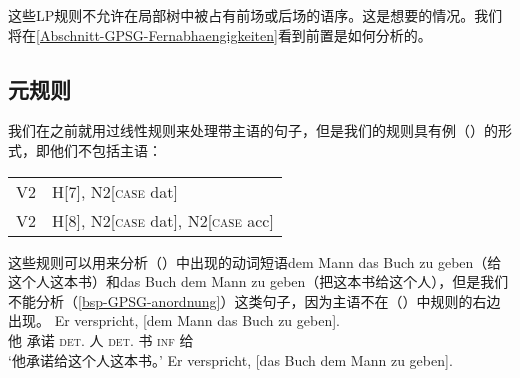 这些LP规则不允许在局部树中被占有前场或后场的语序。这是想要的情况。我们将在\ref{Abschnitt-GPSG-Fernabhaengigkeiten}看到前置是如何分析的。

\subsection{元规则}
\label{sec-metarules-gpsg}

我们在之前就用过线性规则来处理带主语的句子，但是我们的规则具有例（）的形式，即他们不包括主语：
\ea
\label{gpsg-regel-dat-ditransitiv}
\begin{tabular}[t]{@{}l@{~$\to$~}l@{}}
V2  & H[7], N2[\textsc{case} dat]                \\
V2  & H[8], N2[\textsc{case} dat], N2[\textsc{case} acc]  \\
\end{tabular}
\z
这些规则可以用来分析（）中出现的动词短语dem Mann das Buch zu geben（给这个人这本书）和das Buch dem Mann zu geben（把这本书给这个人），但是我们不能分析（\ref{bsp-GPSG-anordnung}）这类句子，因为主语不在（）中规则的右边出现。
\eal
\ex 
\gll Er verspricht, [dem Mann das Buch zu geben].\\
     他 承诺    \spacebr{}\textsc{det}.\dat{} 人 \textsc{det}.\acc{} 书 \textsc{inf} 给\\
\glt `他承诺给这个人这本书。'
\ex 
\gll Er verspricht, [das Buch dem Mann zu geben].\\
